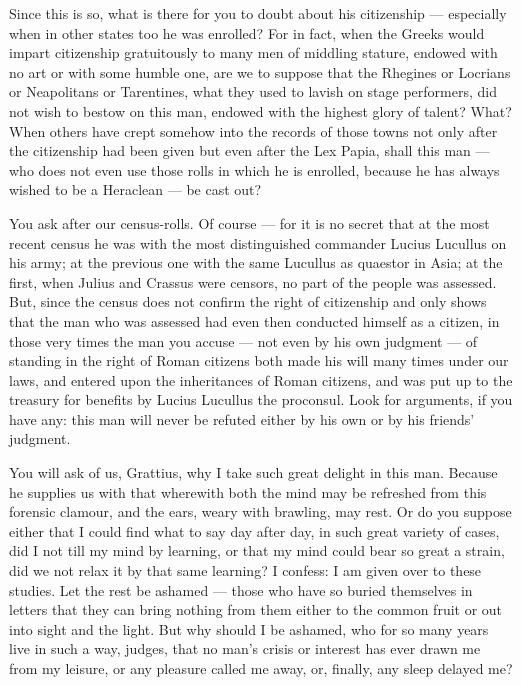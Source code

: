  Since this is so, what is there for you to doubt about his citizenship --- especially when in other states too he was enrolled? For in fact, when the Greeks would impart citizenship gratuitously to many men of middling stature, endowed with no art or with some humble one, are we to suppose that the Rhegines or Locrians or Neapolitans or Tarentines, what they used to lavish on stage performers, did not wish to bestow on this man, endowed with the highest glory of talent? What? When others have crept somehow into the records of those towns not only after the citizenship had been given but even after the Lex Papia, shall this man --- who does not even use those rolls in which he is enrolled, because he has always wished to be a Heraclean --- be cast out?

 You ask after our census-rolls. Of course --- for it is no secret that at the most recent census he was with the most distinguished commander Lucius Lucullus on his army; at the previous one with the same Lucullus as quaestor in Asia; at the first, when Julius and Crassus were censors, no part of the people was assessed. But, since the census does not confirm the right of citizenship and only shows that the man who was assessed had even then conducted himself as a citizen, in those very times the man you accuse --- not even by his own judgment --- of standing in the right of Roman citizens both made his will many times under our laws, and entered upon the inheritances of Roman citizens, and was put up to the treasury for benefits by Lucius Lucullus the proconsul. Look for arguments, if you have any: this man will never be refuted either by his own or by his friends' judgment.

 You will ask of us, Grattius, why I take such great delight in this man. Because he supplies us with that wherewith both the mind may be refreshed from this forensic clamour, and the ears, weary with brawling, may rest. Or do you suppose either that I could find what to say day after day, in such great variety of cases, did I not till my mind by learning, or that my mind could bear so great a strain, did we not relax it by that same learning? I confess: I am given over to these studies. Let the rest be ashamed --- those who have so buried themselves in letters that they can bring nothing from them either to the common fruit or out into sight and the light. But why should I be ashamed, who for so many years live in such a way, judges, that no man's crisis or interest has ever drawn me from my leisure, or any pleasure called me away, or, finally, any sleep delayed me?

